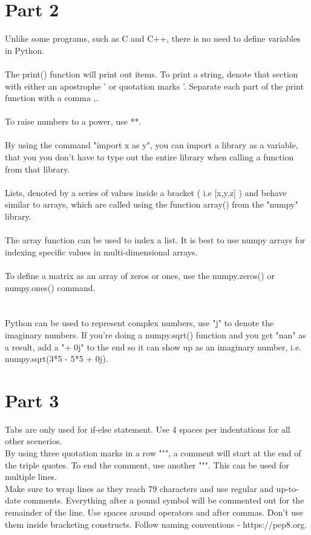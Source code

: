 \documentclass[12pt,a4paper]{article}
\begin{document}
\section{Part 2}\label{sec:intro}
Unlike some programs, such as C and C++, there is no need to define variables in Python.\\
\\The print() function will print out items. To print a string, denote that section with either an apostrophe ' or quotation marks '. Separate each part of the print function with a comma ,. \\
\\To raise numbers to a power, use **.\\
\\By using the command "import x as y", you can import a library as a variable, that you you don't have to type out the entire library when calling a function from that library.\\
\\Lists, denoted by a series of values inside a bracket ( i.e [x,y,z] ) and behave similar to arrays, which are called using the function array() from the "numpy" library.\\
\\The array function can be used to index a list. It is best to use numpy arrays for indexing specific values in multi-dimensional arrays.\\
\\To define a matrix as an array of zeros or ones, use the numpy.zeros() or numpy.ones() command.\\
\\
\\Python can be used to represent complex numbers, use "j" to denote the imaginary numbers. If you're doing a numpy.sqrt() function and you get "nan" as a result, add a "+ 0j" to the end so it can show up as an imaginary number, i.e. numpy.sqrt(3*5 - 5*5 + 0j).\\
\section{Part 3}\label{sec:intro}
Tabs are only used for if-else statement. Use 4 spaces per indentations for all other scenerios.\\
By using three quotation marks in a row """, a comment will start at the end of the triple quotes. To end the comment, use another """. This can be used for multiple lines.\\
Make sure to wrap lines as they reach 79 characters and use regular and up-to-date comments. Everything after a pound symbol will be commented out for the remainder of the line. Use spaces around operators and after commas. Don't use them inside bracketing constructs. Follow naming conventions - https://pep8.org.\\
\end{document}
